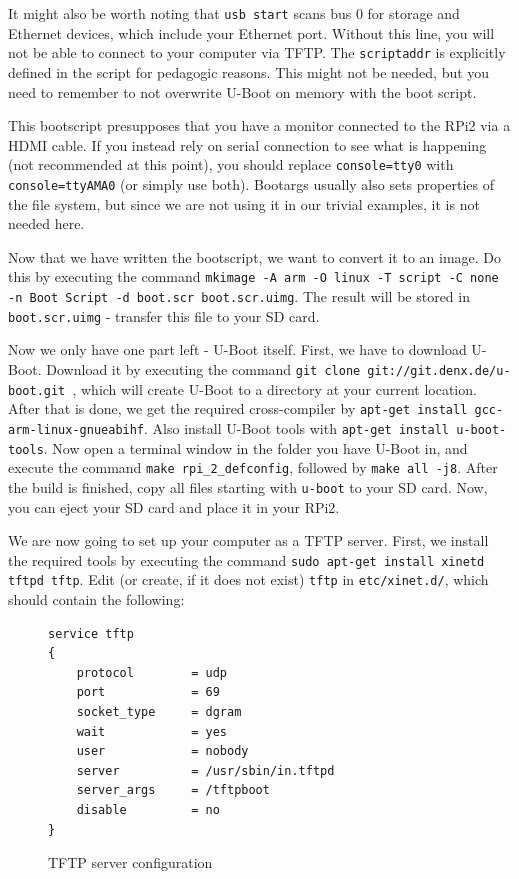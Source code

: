 \documentclass[a4paper,11pt,reqno]{amsart}
\begin{document}
It might also be worth noting that \texttt{usb start} scans bus 0 for storage and Ethernet devices, which include your Ethernet port. Without this line, you will not be able to connect to your computer via TFTP. The \texttt{scriptaddr} is explicitly defined in the script for pedagogic reasons. This might not be needed, but you need to remember to not overwrite U-Boot on memory with the boot script. 

This bootscript presupposes that you have a monitor connected to the RPi2 via a HDMI cable. If you instead rely on serial connection to see what is happening (not recommended at this point), you should replace \texttt{console=tty0} with \texttt{console=ttyAMA0} (or simply use both). Bootargs usually also sets properties of the file system, but since we are not using it in our trivial examples, it is not needed here.

Now that we have written the bootscript, we want to convert it to an image. Do this by executing the command \texttt{mkimage -A arm -O linux -T script -C none -n Boot Script -d boot.scr boot.scr.uimg}. The result will be stored in \texttt{boot.scr.uimg} - transfer this file to your SD card.

Now we only have one part left - U-Boot itself. First, we have to download U-Boot. Download it by executing the command \texttt{git clone git://git.denx.de/u-boot.git
}, which will create U-Boot to a directory at your current location. After that is done, we get the required cross-compiler by \texttt{apt-get install gcc-arm-linux-gnueabihf}. Also install U-Boot tools with \texttt{apt-get install u-boot-tools}. Now open a terminal window in the folder you have U-Boot in, and execute the command \texttt{make rpi\_2\_defconfig}, followed by \texttt{make all -j8}. After the build is finished, copy all files starting with \texttt{u-boot} to your SD card. Now, you can eject your SD card and place it in your RPi2.

We are now going to set up your computer as a TFTP server. First, we install the required tools by executing the command \texttt{sudo apt-get install xinetd tftpd tftp}. Edit (or create, if it does not exist) \texttt{tftp} in \texttt{etc/xinet.d/}, which should contain the following:

\begin{figure}[hb]
\begin{center}
\begin{BVerbatim}
service tftp
{
    protocol        = udp
    port            = 69
    socket_type     = dgram
    wait            = yes
    user            = nobody
    server          = /usr/sbin/in.tftpd
    server_args     = /tftpboot
    disable         = no
}
\end{BVerbatim}
\end{center}
\caption{TFTP server configuration}
\label{fig:boots}
\end{figure}
\end{document}
